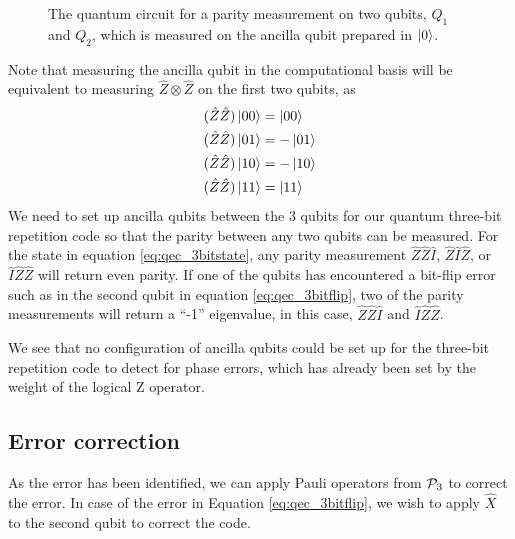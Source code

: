 \begin{figure}[htbp]
  \centering
  \caption{The quantum circuit for a parity measurement on two qubits, $Q_1$ and $Q_2$, which is measured on the ancilla qubit prepared in $\ket{0}$.}\label{fig:2qubitparity}
\end{figure}

Note that measuring the ancilla qubit in the computational basis will be equivalent to measuring $\hat{Z}\otimes \hat{Z}$ on the first two qubits, as
\begin{align*}
    (\hat{Z}\hat{Z})\ket{00} &= \ket{00} \\
    (\hat{Z}\hat{Z})\ket{01} &= -\ket{01} \\
    (\hat{Z}\hat{Z})\ket{10} &= -\ket{10} \\
    (\hat{Z}\hat{Z})\ket{11} &= \ket{11} 
\end{align*}
We need to set up ancilla qubits between the 3 qubits for our quantum three-bit repetition code so that the parity between any two qubits can be measured. For the state in equation \eqref{eq:qec_3bitstate}, any parity measurement $\hat{Z}\hat{Z}\hat{I}$, $\hat{Z}\hat{I}\hat{Z}$, or $\hat{I}\hat{Z}\hat{Z}$ will return even parity. If one of the qubits has encountered a bit-flip error such as in the second qubit in equation \eqref{eq:qec_3bitflip}, two of the parity measurements will return a ``-1'' eigenvalue, in this case, $\hat{Z}\hat{Z}\hat{I}$ and $\hat{I}\hat{Z}\hat{Z}$. 

We see that no configuration of ancilla qubits could be set up for the three-bit repetition code to detect for phase errors, which has already been set by the weight of the logical Z operator.

\subsection{Error correction}

As the error has been identified, we can apply Pauli operators from $\mathcal{P}_3$ to correct the error. In case of the error in Equation \eqref{eq:qec_3bitflip}, we wish to apply $\hat{X}$ to the second qubit to correct the code.

